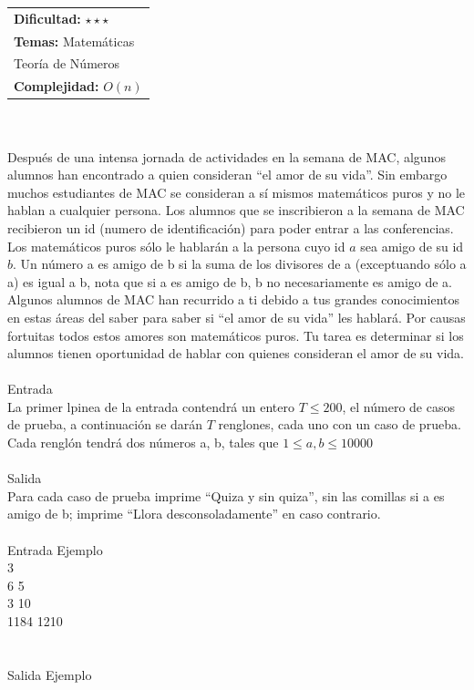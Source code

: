 \documentclass[12pt]{article}
\begin{document}
{{{\hfill
\begin{tabular}{@{}l@{}}
\textbf{Dificultad:} $\star\star\star$ \\
\textbf{Temas:} Matemáticas \\
Teoría de Números \\
\textbf{Complejidad:} $O(n)$
\end{tabular}\\
\\
Después de una intensa jornada de actividades en la semana de MAC, algunos alumnos han encontrado a quien consideran “el amor de su vida”. Sin embargo muchos estudiantes de MAC se consideran a sí mismos matemáticos puros y no le hablan a cualquier persona. Los alumnos que se inscribieron a la semana de MAC recibieron un id (numero de identificación) para poder entrar a las conferencias. Los matemáticos puros sólo le hablarán a la persona cuyo id $a$ sea amigo de su id $b$. Un número a es amigo de b si la suma de los divisores de a (exceptuando sólo a a) es igual a b, nota que si a es amigo de b, b no necesariamente es amigo de a. Algunos alumnos de MAC han recurrido a ti debido a tus grandes conocimientos en estas áreas del saber para saber si “el amor de su vida” les hablará. Por causas fortuitas todos estos amores son matemáticos puros. Tu tarea es determinar si los alumnos tienen oportunidad de hablar con quienes consideran el amor de su vida.
\\
\\
\textrm{\large Entrada}
\\
La primer lpinea de la entrada contendrá un entero $T ≤ 200$, el número de casos de prueba, a continuación se darán $T$ renglones, cada uno con un caso de prueba. Cada renglón tendrá dos números a, b, tales que $1 ≤ a, b ≤ 10000$
\\
\\
\textrm{\large Salida}
\\
Para cada caso de prueba imprime “Quiza y sin quiza”, sin las comillas si a es amigo de b; imprime “Llora desconsoladamente” en caso contrario.
\\
\\
\textrm{\large Entrada Ejemplo}
\\
3\\
6 5\\
3 10\\
1184 1210\\
\\
\\
\textrm{\large Salida Ejemplo}
\\
}}}
\end{document}
